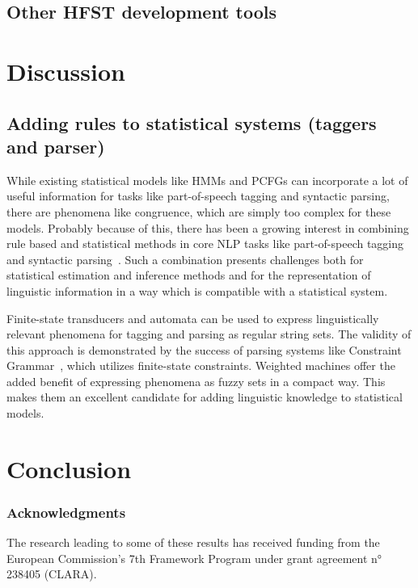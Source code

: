 \documentclass{llncs}
\begin{document}
\subsection{Other HFST development tools}

\section{Discussion}\label{hfst:discussion}

\subsection{Adding rules to statistical systems (taggers and parser)}
While existing statistical models like HMMs and PCFGs can incorporate
a lot of useful information for tasks like part-of-speech tagging and
syntactic parsing, there are phenomena like congruence, which are
simply too complex for these models. Probably because of this, there
has been a growing interest in combining rule based and statistical
methods in core NLP tasks like part-of-speech tagging and syntactic
parsing~\cite{manning/2011}. Such a combination presents challenges
both for statistical estimation and inference methods and for the
representation of linguistic information in a way which is compatible
with a statistical system.

Finite-state transducers and automata can be used to express
linguistically relevant phenomena for tagging and parsing as regular
string sets. The validity of this approach is demonstrated by the
success of parsing systems like Constraint
Grammar~\cite{karlsson/1990}, which utilizes finite-state
constraints. Weighted machines offer the added benefit of expressing
phenomena as fuzzy sets in a compact way. This makes them an excellent
candidate for adding linguistic knowledge to statistical models.

\section{Conclusion}\label{hfst:conclusion}

\subsubsection*{Acknowledgments}
The research leading to some of these results has received funding from the
European Commission's 7th Framework Program under grant agreement n° 238405 (CLARA).




\end{document}
